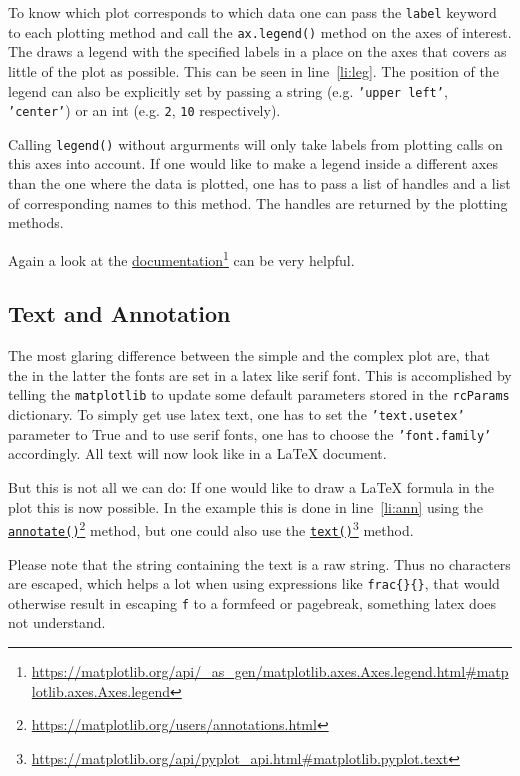 \documentclass[a4paper, 11pt, onecolumn]{article}
\newcommand{\mpl}{\texttt{matplotlib}\xspace}
\newcommand{\pl}[1]{\mbox{\texttt{#1}\xspace}}
\newcommand{\latex}{\LaTeX\xspace}
\newcommand{\fref}[2]{\href{#1}{#2}\footnote{\url{#1}}}
\newcommand{\baseref}[3]{\mbox{#1 \ref{#2:#3}\xspace}}
\newcommand{\lin}[1]{\baseref{line}{li}{#1}}
\begin{document}
To know which plot corresponds to which data one can pass the \pl{label} 
keyword to each plotting method and call the \pl{ax.legend()} method on the
axes of interest. The draws a legend with the specified labels in a place on
the axes that covers as little of the plot as possible. This can be seen in
\lin{leg}. The position of the legend can also be explicitly set by 
passing a string (e.g. \pl{'upper left'}, \pl{'center'}) or an int (e.g.
\pl{2}, \pl{10} respectively).

Calling \pl{legend()} without argurments will only take labels from plotting
calls on this axes into account. If one would like to make a legend inside a
different axes than the one where the data is plotted, one has to pass a list
of handles and a list of corresponding names to this method. The handles are
returned by the plotting methods.

Again a look at the \fref{https://matplotlib.org/api/\_as\_gen/matplotlib.axes.Axes.legend.html\#matplotlib.axes.Axes.legend}{documentation}
can be very helpful.


\subsection{Text and Annotation}

The most glaring difference between the simple and the complex plot are, that 
the in the latter the fonts are set in a latex like serif font. This is
accomplished by telling the \mpl to update some default parameters stored
in the \pl{rcParams} dictionary. To simply get use latex text, one has to set
the \pl{'text.usetex'} parameter to True and to use serif fonts, one has to
choose the \pl{'font.family'} accordingly. All text will now look like in a
\latex document.

But this is not all we can do: If one would like to draw a \latex formula in
the plot this is now possible. In the example this is done in \lin{ann}
using the \fref{https://matplotlib.org/users/annotations.html}{\pl{annotate()}}
method, but one could also use the
\fref{https://matplotlib.org/api/pyplot\_api.html\#matplotlib.pyplot.text}{\pl{text()}} method.

Please note that the string containing the text is a raw string. Thus no 
characters are escaped, which helps a lot when using expressions like
\pl{\\frac\{\}\{\}}, that would otherwise result in escaping \pl{\\f} to a
formfeed or pagebreak, something latex does not understand.
\end{document}
